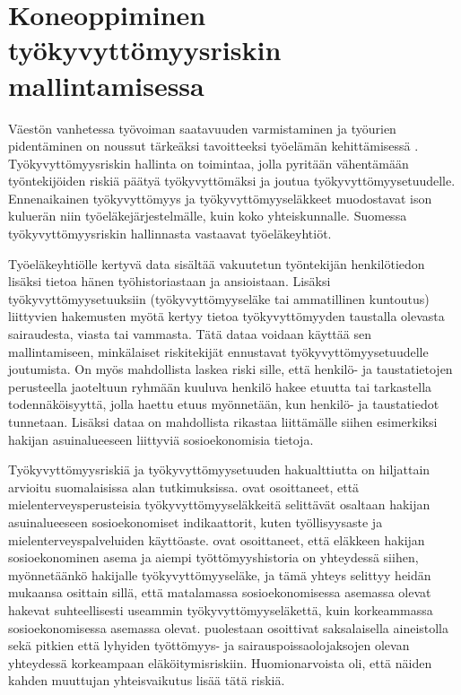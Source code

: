 \chapter{Koneoppiminen työkyvyttömyysriskin mallintamisessa\label{applications}}

Väestön vanhetessa työvoiman saatavuuden varmistaminen ja työurien pidentäminen on noussut tärkeäksi tavoitteeksi työelämän kehittämisessä \citep{noauthor_paaministeri_2019}. Työkyvyttömyysriskin hallinta on toimintaa, jolla pyritään vähentämään työntekijöiden riskiä päätyä työkyvyttömäksi ja joutua työkyvyttömyysetuudelle. Ennenaikainen työkyvyttömyys ja työkyvyttömyyseläkkeet muodostavat ison kuluerän niin työeläkejärjestelmälle, kuin koko yhteiskunnalle. Suomessa työkyvyttömyysriskin hallinnasta vastaavat työeläkeyhtiöt.

Työeläkeyhtiölle kertyvä data sisältää vakuutetun työntekijän henkilötiedon lisäksi tietoa hänen työhistoriastaan ja ansioistaan. Lisäksi työkyvyttömyysetuuksiin (työkyvyttömyyseläke tai ammatillinen kuntoutus) liittyvien hakemusten myötä kertyy tietoa työkyvyttömyyden taustalla olevasta sairaudesta, viasta tai vammasta. Tätä dataa voidaan käyttää sen mallintamiseen, minkälaiset riskitekijät ennustavat työkyvyttömyysetuudelle joutumista. On myös mahdollista laskea riski sille, että henkilö- ja taustatietojen perusteella jaoteltuun ryhmään kuuluva henkilö hakee etuutta tai tarkastella todennäköisyyttä, jolla haettu etuus myönnetään, kun henkilö- ja taustatiedot tunnetaan. Lisäksi dataa on mahdollista rikastaa liittämälle siihen esimerkiksi hakijan asuinalueeseen liittyviä sosioekonomisia tietoja.

Työkyvyttömyysriskiä ja työkyvyttömyysetuuden hakualttiutta on hiljattain arvioitu suomalaisissa alan tutkimuksissa. \citet{karolaakso_contextual_2021, karolaakso_socioeconomic_2020} ovat osoittaneet, että mielenterveysperusteisia työkyvyttömyyseläkkeitä selittävät osaltaan hakijan asuinalueeseen sosioekonomiset indikaattorit, kuten työllisyysaste ja mielenterveyspalveluiden käyttöaste. \citet{perhoniemi_determinants_2020, perhoniemi_tyokyvyttomyyselakehakemusten_2020} ovat osoittaneet, että eläkkeen hakijan sosioekonominen asema ja aiempi työttömyyshistoria on yhteydessä siihen, myönnetäänkö hakijalle työkyvyttömyyseläke, ja tämä yhteys selittyy heidän mukaansa osittain sillä, että matalamassa sosioekonomisessa asemassa olevat hakevat suhteellisesti useammin työkyvyttömyyseläkettä, kuin korkeammassa sosioekonomisessa asemassa olevat. \citet{bethge_using_2021} puolestaan osoittivat saksalaisella aineistolla sekä pitkien että lyhyiden työttömyys- ja sairauspoissaolojaksojen olevan yhteydessä korkeampaan eläköitymisriskiin. Huomionarvoista oli, että näiden kahden muuttujan yhteisvaikutus lisää tätä riskiä.

